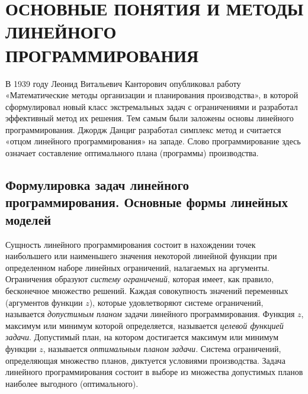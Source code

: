 \section{ОСНОВНЫЕ ПОНЯТИЯ И МЕТОДЫ ЛИНЕЙНОГО ПРОГРАММИРОВАНИЯ}

В 1939 году Леонид Витальевич Канторович опубликовал работу «Математические методы организации и планирования производства», в которой сформулировал новый класс экстремальных задач с ограничениями и разработал эффективный метод их решения. Тем самым были заложены основы линейного программирования. Джордж Данциг разработал симплекс метод и считается «отцом линейного программирования» на западе. Слово программирование здесь означает составление оптимального плана (программы) производства.

\subsection{Формулировка задач линейного программирования. Основные формы линейных моделей}

Сущность линейного программирования состоит в нахождении точек наибольшего или наименьшего значения некоторой линейной функции при определенном наборе линейных ограничений, налагаемых на аргументы. Ограничения образуют \textit{систему ограничений}, которая имеет, как правило, бесконечное множество решений. Каждая совокупность значений переменных (аргументов функции $z$), которые удовлетворяют системе ограничений, называется \textit{допустимым планом} задачи линейного программирования. Функция $z$, максимум или минимум которой определяется, называется \textit{целевой функцией задачи}. Допустимый план, на котором достигается  максимум или минимум функции $z$, называется \textit{оптимальным планом задачи.} Система ограничений, определяющая множество планов, диктуется условиями производства. Задача линейного программирования состоит в выборе из множества допустимых планов наиболее выгодного (оптимального).


